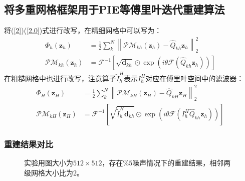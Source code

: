 \documentclass[10pt,aspectratio=169]{beamer} %
\renewcommand{\vec}[1]{\boldsymbol{#1}} %
\begin{document}
\subsection{将多重网格框架用于PIE等傅里叶迭代重建算法}

\begin{frame}
    将(\ref{2})(\ref{2.0})式进行改写，在精细网格中可以写为：
    \begin{align*}
        \Phi_h (\vec{z}_h) & =\frac{1}{2}\sum_k^N \left\lVert \mathcal{PM}_{kh}(\vec{z}_h)-\hat{Q}_{kh} \vec{z}_h \right\rVert _2^2 \\
        \mathcal{PM}_{kh}(\vec{z}_h)&=\mathcal{F}^{-1} \left[\sqrt{\vec{d}_{kh}}\odot \exp{(i \theta \mathcal{F}(\hat{Q}_{kh} \vec{z}_h))}\right]
    \end{align*}
    在粗糙网格中也进行改写，注意算子$\tilde{I}_h^H$表示$I_h^H$对应在傅里叶空间中的滤波器：
    \begin{align*}
        \Phi_H (\vec{z}_H) & =\frac{1}{2}\sum_k^N \left\lVert \mathcal{PM}_{kH}(\vec{z}_H)-\hat{Q}_{kH} \vec{z}_H \right\rVert _2^2 \\
        \mathcal{PM}_{kH}(\vec{z}_H)&=\mathcal{F}^{-1} \left[\sqrt{\tilde{I}_h^H\vec{d}_{kh}}\odot \exp{(i \theta \mathcal{F}(I_h^H \hat{Q}_{kh} \vec{z}_h))}\right]
    \end{align*}
\end{frame}

\begin{frame}
    \frametitle{重建结果对比}
    \begin{figure}
        \quad
        \quad

        实验用图大小为$512 \times 512$，存在$\% 5$噪声情况下的重建结果，相邻两级网格大小比为2。
    \end{figure}
\end{frame}
\end{document}

